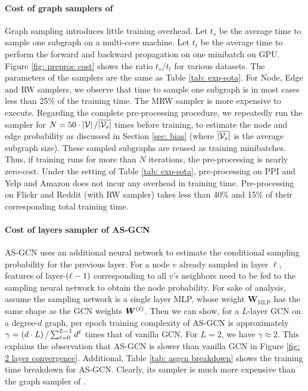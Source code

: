 \paragraph{Cost of graph samplers of {\graphsaint}} Graph sampling introduces little training overhead.
Let $t_s$ be the average time to sample one subgraph on a multi-core machine. Let $t_t$ be the average time to perform the forward and backward propagation on one minibatch on GPU. 
Figure \ref{fig: preproc cost} shows the ratio $t_s/t_t$ for various datasets. The parameters of the samplers are the same as Table \ref{tab: exp-sota}. For Node, Edge and RW samplers, we observe that time to sample one subgraph is in most cases less than 25\% of the training time. 
The MRW sampler is more expensive to execute. 
Regarding the complete pre-processing procedure, we repeatedly run the sampler for $N=50\cdot \size{\V}/\overline{\size{\V[s]}}$ times before training, to estimate the node and edge probability as discussed in Section \ref{sec: bias} (where $\overline{\size{\V[s]}}$ is the average subgraph size). These sampled subgraphs are reused as training minibatches. Thus, if training runs for more than $N$ iterations, the pre-processing is nearly zero-cost. 
Under the setting of Table \ref{tab: exp-sota}, pre-processing on PPI and Yelp and Amazon does not incur any overhead in training time. Pre-processing on Flickr and Reddit (with RW sampler) takes less than 40\% and 15\% of their corresponding total training time. 

\paragraph{Cost of layers sampler of AS-GCN}
AS-GCN uses an additional neural network to estimate the conditional sampling probability for the previous layer. For a node $v$ already sampled in layer $\ell$, features of layer-$\left( \ell-1 \right)$ corresponding to all $v$'s neighbors need to be fed to the sampling neural network to obtain the node probability. For sake of analysis, assume the sampling network is a single layer MLP, whose weight $\bm{W}_\text{MLP}$ has the same shape as the GCN weights $\bm{W}^{\left( \ell \right)}$. 
Then we can show, for a $L$-layer GCN on a degree-$d$ graph, per epoch training complexity of AS-GCN is approximately $\gamma=\left( d\cdot L \right)/\sum_{\ell=0}^{L-1}d^\ell$ times that of vanilla GCN. For $L=2$, we have $\gamma\approx 2$. This explains the observation that AS-GCN is slower than vanilla GCN in Figure \ref{fig: 2 layer convergence}. Additional, Table \ref{tab: asgcn breakdown} shows the training time breakdown for AS-GCN. Clearly, its sampler is much more expensive than the graph sampler of {\graphsaint}. 

